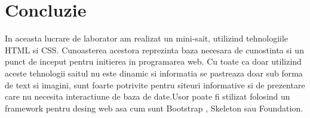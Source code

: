 \section*{Concluzie}

In aceasta lucrare de laborator am realizat un mini-sait, utilizind tehnologiile
HTML si CSS. Cunoasterea acestora reprezinta baza necesara de cunostinta si 
un punct de inceput pentru initierea in programarea web. Cu toate ca doar utilizind 
aceste tehnologii saitul nu este dinamic si  informatia se pastreaza doar sub forma de text si imagini, 
sunt foarte potrivite pentru siteuri informative si de prezentare care nu necesita interactiune de 
baza de date.Usor poate fi stilizat folosind un framework pentru desing web asa cum sunt Bootstrap , Skeleton sau Foundation.

\clearpage
